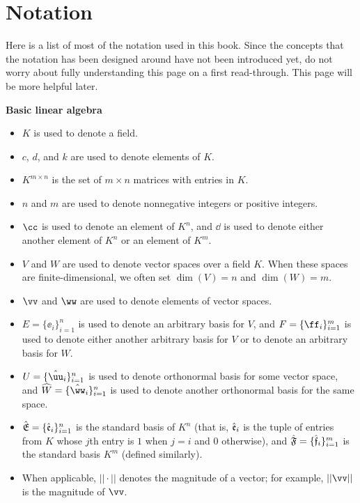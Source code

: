 \chapter*{Notation}

Here is a list of most of the notation used in this book. Since the concepts that the notation has been designed around have not been introduced yet, do not worry about fully understanding this page on a first read-through. This page will be more helpful later.

\small

\vspace{.25cm}

\textbf{Basic linear algebra}

\begin{itemize}
    \item $K$ is used to denote a field.
    \item $c$, $d$, and $k$ are used to denote elements of $K$.
    \item $K^{m \times n}$ is the set of $m \times n$ matrices with entries in $K$.
    \item $n$ and $m$ are used to denote nonnegative integers or positive integers.
    \item $\cc$ is used to denote an element of $K^n$, and $\dd$ is used to denote either another element of $K^n$ or an element of $K^m$.
    \item $V$ and $W$ are used to denote vector spaces over a field $K$. When these spaces are finite-dimensional, we often set $\dim(V) = n$ and $\dim(W) = m$.
    \item $\vv$ and $\ww$ are used to denote elements of vector spaces.
    \item $E = \{\ee_i\}_{i = 1}^n$ is used to denote an arbitrary basis for $V$, and $F = \{\ff_i\}_{i = 1}^m$ is used to denote either another arbitrary basis for $V$ or to denote an arbitrary basis for $W$.
    \item $U = \{\huu_i\}_{i = 1}^n$ is used to denote orthonormal basis for some vector space, and $\hW = \{\hww_i\}_{i = 1}^n$ is used to denote another orthonormal basis for the same space.
    \item ${\hat{\mathfrak{E}}} = \{\hat{\mathfrak{e}}_i\}_{i = 1}^n$ is the standard basis of $K^n$ (that is, $\hat{\mathfrak{e}}_i$ is the tuple of entries from $K$ whose $j$th entry is $1$ when $j = i$ and $0$ otherwise), and ${\hat{\mathfrak{F}}} = \{\hat{\mathfrak{f}}_i\}_{i = 1}^m$ is the standard basis $K^m$ (defined similarly).
    \item When applicable, $||\cdot||$ denotes the magnitude of a vector; for example, $||\vv||$ is the magnitude of $\vv$.

\end{itemize}

